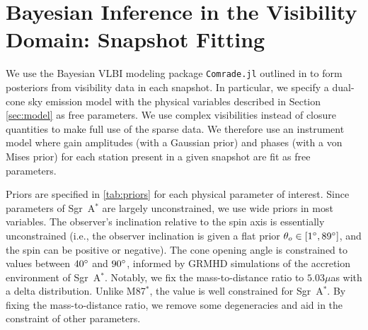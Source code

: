 \documentclass[linenumbers, twocolumn, tighten]{aastex701}
\def\sgra{Sgr~A$^*$\xspace}
\begin{document}
\section{Bayesian Inference in the Visibility Domain: Snapshot Fitting} \label{sec:inference}

We use the Bayesian VLBI modeling package \texttt{Comrade.jl} outlined in \citealt{Tiede2022} to form posteriors from visibility data in each snapshot. In particular, we specify a dual-cone sky emission model with the physical variables described in Section \ref{sec:model} as free parameters. We use complex visibilities instead of closure quantities to make full use of the sparse data. We therefore use an instrument model where gain amplitudes (with a Gaussian prior) and phases (with a von Mises prior) for each station present in a given snapshot are fit as free parameters.

Priors are specified in \autoref{tab:priors} for each physical parameter of interest. Since parameters of \sgra are largely unconstrained, we use wide priors in most variables. The observer's inclination relative to the spin axis is essentially unconstrained (i.e., the observer inclination is given a flat prior $\theta_o \in [1\degree, 89\degree]$, and the spin can be positive or negative). The cone opening angle is constrained to values between $40\degree$ and $90\degree$, informed by GRMHD simulations of the accretion environment of \sgra \citep{Chang2024}. Notably, we fix the mass-to-distance ratio to $5.03 \mu$as with a delta distribution. Unlike M87$^*$, the value is well constrained for \sgra \citep{2019A&A...625L..10G, 2020A&A...636L...5G, 2019Sci...365..664D}. By fixing the mass-to-distance ratio, we remove some degeneracies and aid in the constraint of other parameters.
\end{document}
